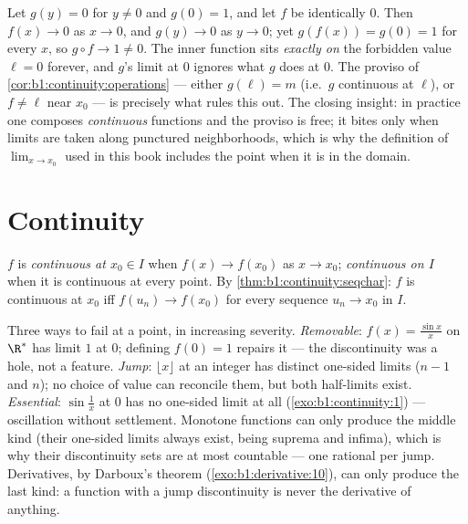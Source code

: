 \begin{example}\label{ex:b1:continuity:compositiontrap}
Let $g(y) = 0$ for $y \neq 0$ and $g(0) = 1$, and let $f$ be
identically $0$. Then $f(x) \to 0$ as $x \to 0$, and $g(y) \to 0$
as $y \to 0$; yet $g(f(x)) = g(0) = 1$ for every $x$, so $g
\circ f \to 1 \neq 0$. The inner function sits \emph{exactly on}
the forbidden value $\ell = 0$ forever, and $g$'s limit at $0$
ignores what $g$ does at $0$. The proviso of
\cref{cor:b1:continuity:operations} --- either $g(\ell) = m$
(i.e.\ $g$ continuous at $\ell$), or $f \neq \ell$ near $x_0$ ---
is precisely what rules this out. The closing insight: in
practice one composes \emph{continuous} functions and the
proviso is free; it bites only when limits are taken along
punctured neighborhoods, which is why the definition of
$\lim_{x \to x_0}$ used in this book includes the point when it
is in the domain.
\end{example}

\section{Continuity}

\begin{definition}\label{def:b1:continuity:continuous}
$f$ is \emph{continuous at $x_0 \in I$} when $f(x)
\to f(x_0)$ as $x \to x_0$; \emph{continuous on $I$} when it is
continuous at every point. By
\cref{thm:b1:continuity:seqchar}: $f$ is continuous at $x_0$ iff
$f(u_n) \to f(x_0)$ for every sequence $u_n \to x_0$ in $I$.
\end{definition}

\begin{example}\label{ex:b1:continuity:taxonomy}
Three ways to fail at a point, in increasing severity.
\emph{Removable}: $f(x) = \frac{\sin x}{x}$ on $\R^*$ has limit
$1$ at $0$; defining $f(0) = 1$ repairs it --- the discontinuity
was a hole, not a feature. \emph{Jump}: $\lfloor x \rfloor$ at
an integer has distinct one-sided limits ($n - 1$ and $n$); no
choice of value can reconcile them, but both half-limits exist.
\emph{Essential}: $\sin\frac1x$ at $0$ has no one-sided limit at
all (\cref{exo:b1:continuity:1}) --- oscillation without
settlement. Monotone functions can only produce the middle kind
(their one-sided limits always exist, being suprema and infima),
which is why their discontinuity sets are at most countable ---
one rational per jump. Derivatives, by Darboux's theorem
(\cref{exo:b1:derivative:10}), can only produce the last kind:
a function with a jump discontinuity is never the derivative of
anything.
\end{example}

